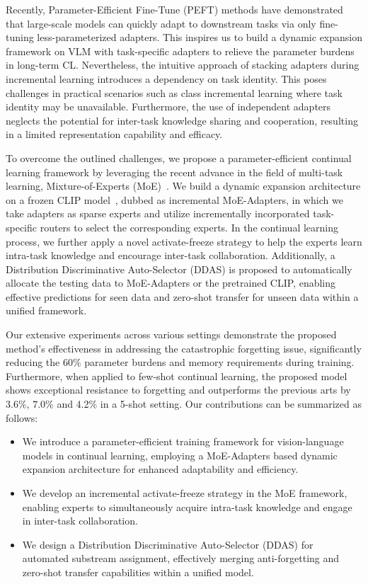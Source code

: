 Recently, Parameter-Efficient Fine-Tune (PEFT) methods \cite{gao2023clip, sung2022vl, zhang2021tip, zaken2021bitfit, hu2021lora} have demonstrated that large-scale models can quickly adapt to downstream tasks via only fine-tuning less-parameterized adapters. This inspires us to build a dynamic expansion framework on VLM with task-specific adapters to relieve the parameter burdens in long-term CL.  Nevertheless, the intuitive approach of stacking adapters during incremental learning introduces a dependency on task identity. This poses challenges in practical scenarios such as class incremental learning where task identity may be unavailable. Furthermore, the use of independent adapters neglects the potential for inter-task knowledge sharing and cooperation, resulting in a limited representation capability and efficacy.


To overcome the outlined challenges, we propose a parameter-efficient continual learning framework by leveraging the recent advance in the field of multi-task learning, Mixture-of-Experts (MoE)~\cite{jacobs1991adaptive, shazeer2017outrageously}. We build a dynamic expansion architecture on a frozen CLIP model~\cite{radford2021learning}, dubbed as incremental MoE-Adapters, in which we take adapters as sparse experts and utilize incrementally incorporated task-specific routers to select the corresponding experts. In the continual learning process, we further apply a novel activate-freeze strategy to help the experts learn intra-task knowledge and encourage inter-task collaboration. Additionally, a Distribution Discriminative Auto-Selector (DDAS) is proposed to automatically allocate the testing data to MoE-Adapters or the pretrained CLIP, enabling effective predictions for seen data and zero-shot transfer for unseen data within a unified framework.




Our extensive experiments across various settings demonstrate the proposed method's effectiveness in addressing the catastrophic forgetting issue, significantly reducing the $60\%$ parameter burdens and memory requirements during training. Furthermore, when applied to few-shot continual learning, the proposed model shows exceptional resistance to forgetting and outperforms the previous arts by $3.6\%$, $7.0\%$ and 4.2\% in a 5-shot setting. 
Our contributions can be summarized as follows:
\begin{itemize}
\item We introduce a parameter-efficient training framework for vision-language models in continual learning, employing a MoE-Adapters based dynamic expansion architecture for enhanced adaptability and efficiency.
\item We develop an incremental activate-freeze strategy in the MoE framework, enabling experts to simultaneously acquire intra-task knowledge and engage in inter-task collaboration.
\item We design a Distribution Discriminative Auto-Selector (DDAS) for automated substream assignment, effectively merging anti-forgetting and zero-shot transfer capabilities within a unified model.
\end{itemize}




